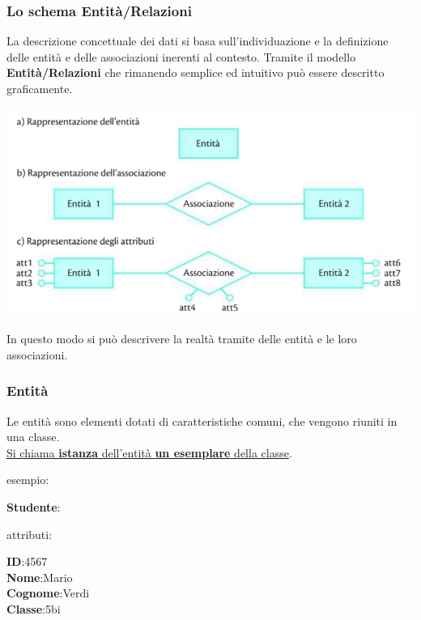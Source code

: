 \documentclass{article}
\begin{document}
\subsubsection{Lo schema Entità/Relazioni}
La descrizione concettuale dei dati si basa sull'individuazione e la definizione delle entità e delle associazioni inerenti al contesto. Tramite il modello \textbf{Entità/Relazioni} che rimanendo semplice ed intuitivo può essere descritto graficamente.\\

\begin{center}
\includegraphics[scale=1.0]{er.PNG}    
\end{center}

In questo modo si può descrivere la realtà tramite delle entità e le loro associazioni.

\subsubsection{Entità}
Le entità sono elementi dotati di caratteristiche comuni, che vengono riuniti in una classe.
\\
\underline{Si chiama \textbf{istanza} dell'entità \textbf{un esemplare} della classe}.

\begin{footnotesize}
esempio:\\
\end{footnotesize}

\textbf{Studente}:\\

\begin{footnotesize}
attributi:\\
\end{footnotesize}
\textbf{ID}:4567\\
\textbf{Nome}:Mario\\
\textbf{Cognome}:Verdi\\
\textbf{Classe}:5bi\\
\end{document}
